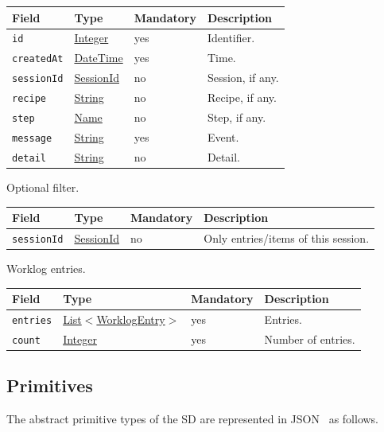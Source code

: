 \documentclass[a4paper]{arrowhead}
\newcommand{\mref}[1]{{\textcolor{ArrowheadPurple}{\hyperref[sec:model:#1]{#1}}}}
\newcommand{\pref}[1]{{\textcolor{ArrowheadGrey}{\hyperref[sec:model:primitives:#1]{#1}}}}
\begin{document}
{\small
\begin{longtable}{|p{3.7cm}|p{4.2cm}|p{1.6cm}|p{6.3cm}|}

\hline
\rowcolor{gray!33} Field & Type & Mandatory & Description \\ \hline
\endhead
\texttt{id} & \pref{Integer} & yes & Identifier. \\ \hline
\texttt{createdAt} & \pref{DateTime} & yes & Time. \\ \hline
\texttt{sessionId} & \pref{SessionId} & no & Session, if any. \\ \hline
\texttt{recipe} & \pref{String} & no & Recipe, if any. \\ \hline
\texttt{step} & \pref{Name} & no & Step, if any. \\ \hline
\texttt{message} & \pref{String} & yes & Event. \\ \hline
\texttt{detail} & \pref{String} & no & Detail. \\ \hline
\end{longtable}
}

Optional filter.

{\small
\begin{longtable}{|p{3.7cm}|p{4.2cm}|p{1.6cm}|p{6.3cm}|}

\hline
\rowcolor{gray!33} Field & Type & Mandatory & Description \\ \hline
\endhead
\texttt{sessionId} & \pref{SessionId} & no & Only entries/items of this session. \\ \hline
\end{longtable}
}

Worklog entries.

{\small
\begin{longtable}{|p{3.7cm}|p{4.2cm}|p{1.6cm}|p{6.3cm}|}

\hline
\rowcolor{gray!33} Field & Type & Mandatory & Description \\ \hline
\endhead
\texttt{entries} & \pref{List}$<$\mref{WorklogEntry}$>$ & yes & Entries. \\ \hline
\texttt{count} & \pref{Integer} & yes & Number of entries. \\ \hline
\end{longtable}
}


\subsection{Primitives}
\label{sec:model:primitives}
The abstract primitive types of the SD are represented in JSON~\cite{rfc8259} as follows.
\end{document}
